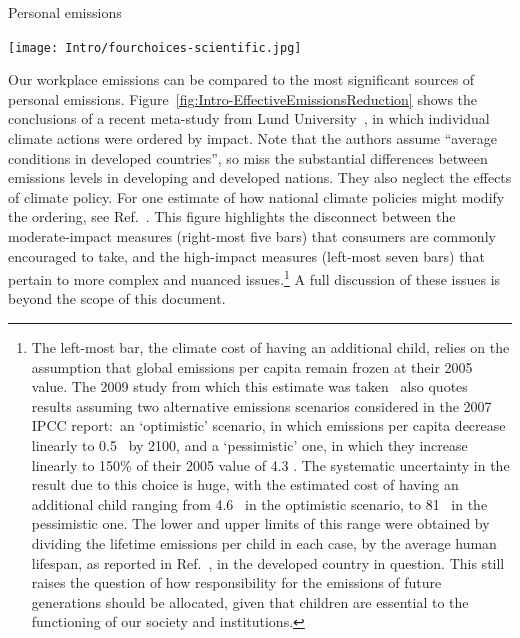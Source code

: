 \documentclass[../SustainableHEP.tex]{subfiles}
\begin{document}
\begin{inset}{Personal emissions}%
\begin{center}
    \captionsetup{type=figure}
    \texttt{[image: Intro/fourchoices-scientific.jpg]}
    \caption[Emissions reduction from individual actions]{Emissions reduction from individual actions.  Black lines correspond to individual developed nations studied, the mean over which is shown as a coloured bar.  Note that these numbers are based on average current emissions in developed countries, and neglecting the effects of climate policy.  The break in the left-most bar distinguishes between the emissions due to direct offspring and integrated emissions over all generations of descendents.  Moreover the integrated estimate assumes emissions per capita that are constant in time. See the accompanying text for a more detailed exposition of the underlying assumptions and leading systematic uncertainties. Figure taken from Ref.~\cite{Wynes_2017}.}
    \label{fig:Intro-EffectiveEmissionsReduction}
\end{center} 
Our workplace emissions can be compared to the most significant sources of personal emissions. Figure~\ref{fig:Intro-EffectiveEmissionsReduction} shows the conclusions of a recent meta-study from Lund University~\cite{Wynes_2017}, in which individual climate actions were ordered by impact.  Note that the authors assume ``average conditions in developed countries'', so miss the substantial differences between emissions levels in developing and developed nations.  They also neglect the effects of climate policy.  For one estimate of how national climate policies might modify the ordering, see Ref.~\cite{FoundersPledge}. This figure highlights the disconnect between the moderate-impact measures (right-most five bars) that consumers are commonly encouraged to take, and the high-impact measures (left-most seven bars) that pertain to more complex and nuanced issues.\footnote{The left-most bar, the climate cost of having an additional child, relies on the assumption that global emissions per capita remain frozen at their 2005 value.  The 2009 study from which this estimate was taken~\cite{MURTAUGH200914} also quotes results assuming two alternative
emissions scenarios considered in the 2007 IPCC report:~an `optimistic' scenario, in which emissions per capita decrease linearly to 0.5 \tCdOe\ by 2100, and a `pessimistic' one, in which they increase linearly to 150\% of their 2005 value of 4.3 \tCdOe.  The systematic uncertainty in the result due to this choice is huge, with the estimated cost of having an additional child ranging from 4.6 \tCdOe\ in the optimistic scenario, to 81 \tCdOe\ in the pessimistic one.  The lower and upper limits of this range were obtained by dividing the lifetime emissions per child in each case, by the average human lifespan, as reported in Ref.~\cite{UN2019}, in the developed country in question.
This still raises the question of how responsibility for the emissions of future generations should be allocated, given that children are essential to the functioning of our society and institutions.}
A full discussion of these issues is beyond the scope of this document.
\end{inset}
\end{document}
